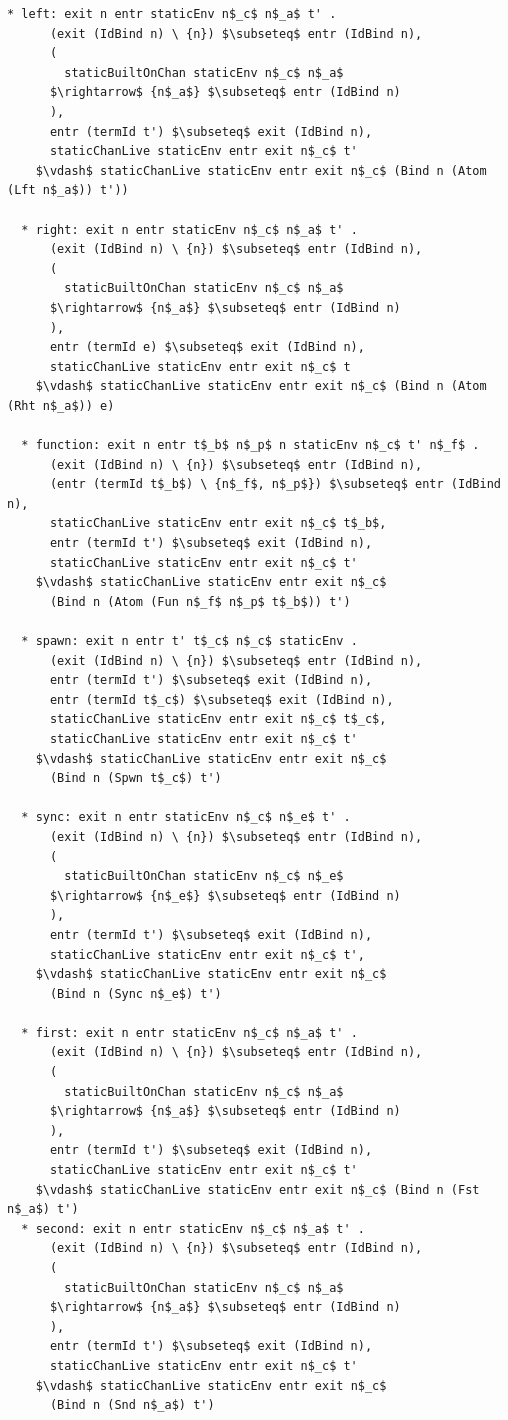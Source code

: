 \documentclass[letterpaper, 11pt]{extarticle}
\begin{document}
\begin{lstlisting}[language=logic, mathescape]
  * left: exit n entr staticEnv n$_c$ n$_a$ t' . 
      (exit (IdBind n) \ {n}) $\subseteq$ entr (IdBind n),
      (
        staticBuiltOnChan staticEnv n$_c$ n$_a$
      $\rightarrow$ {n$_a$} $\subseteq$ entr (IdBind n)
      ),
      entr (termId t') $\subseteq$ exit (IdBind n),
      staticChanLive staticEnv entr exit n$_c$ t'
    $\vdash$ staticChanLive staticEnv entr exit n$_c$ (Bind n (Atom (Lft n$_a$)) t'))

  * right: exit n entr staticEnv n$_c$ n$_a$ t' . 
      (exit (IdBind n) \ {n}) $\subseteq$ entr (IdBind n),
      (
        staticBuiltOnChan staticEnv n$_c$ n$_a$
      $\rightarrow$ {n$_a$} $\subseteq$ entr (IdBind n)
      ),
      entr (termId e) $\subseteq$ exit (IdBind n),
      staticChanLive staticEnv entr exit n$_c$ t
    $\vdash$ staticChanLive staticEnv entr exit n$_c$ (Bind n (Atom (Rht n$_a$)) e)

  * function: exit n entr t$_b$ n$_p$ n staticEnv n$_c$ t' n$_f$ . 
      (exit (IdBind n) \ {n}) $\subseteq$ entr (IdBind n),
      (entr (termId t$_b$) \ {n$_f$, n$_p$}) $\subseteq$ entr (IdBind n),
      staticChanLive staticEnv entr exit n$_c$ t$_b$,
      entr (termId t') $\subseteq$ exit (IdBind n),
      staticChanLive staticEnv entr exit n$_c$ t'
    $\vdash$ staticChanLive staticEnv entr exit n$_c$
      (Bind n (Atom (Fun n$_f$ n$_p$ t$_b$)) t')

  * spawn: exit n entr t' t$_c$ n$_c$ staticEnv .
      (exit (IdBind n) \ {n}) $\subseteq$ entr (IdBind n),
      entr (termId t') $\subseteq$ exit (IdBind n),
      entr (termId t$_c$) $\subseteq$ exit (IdBind n),
      staticChanLive staticEnv entr exit n$_c$ t$_c$,
      staticChanLive staticEnv entr exit n$_c$ t'
    $\vdash$ staticChanLive staticEnv entr exit n$_c$
      (Bind n (Spwn t$_c$) t')

  * sync: exit n entr staticEnv n$_c$ n$_e$ t' .
      (exit (IdBind n) \ {n}) $\subseteq$ entr (IdBind n),
      (
        staticBuiltOnChan staticEnv n$_c$ n$_e$
      $\rightarrow$ {n$_e$} $\subseteq$ entr (IdBind n)
      ),
      entr (termId t') $\subseteq$ exit (IdBind n),
      staticChanLive staticEnv entr exit n$_c$ t',
    $\vdash$ staticChanLive staticEnv entr exit n$_c$
      (Bind n (Sync n$_e$) t')

  * first: exit n entr staticEnv n$_c$ n$_a$ t' .
      (exit (IdBind n) \ {n}) $\subseteq$ entr (IdBind n),
      (
        staticBuiltOnChan staticEnv n$_c$ n$_a$
      $\rightarrow$ {n$_a$} $\subseteq$ entr (IdBind n)
      ),
      entr (termId t') $\subseteq$ exit (IdBind n),
      staticChanLive staticEnv entr exit n$_c$ t'
    $\vdash$ staticChanLive staticEnv entr exit n$_c$ (Bind n (Fst n$_a$) t')
  * second: exit n entr staticEnv n$_c$ n$_a$ t' .
      (exit (IdBind n) \ {n}) $\subseteq$ entr (IdBind n),
      (
        staticBuiltOnChan staticEnv n$_c$ n$_a$
      $\rightarrow$ {n$_a$} $\subseteq$ entr (IdBind n)
      ),
      entr (termId t') $\subseteq$ exit (IdBind n),
      staticChanLive staticEnv entr exit n$_c$ t'
    $\vdash$ staticChanLive staticEnv entr exit n$_c$
      (Bind n (Snd n$_a$) t')


\end{lstlisting}
\end{document}
